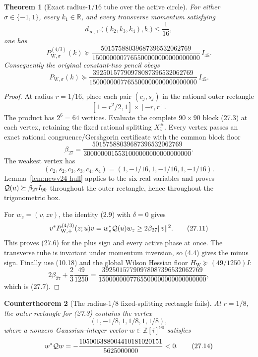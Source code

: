 \documentclass[11pt,oneside]{article}
\newtheorem{theorem}{Theorem}[section]
\newtheorem{countertheorem}[theorem]{Countertheorem}
\theoremstyle{definition}
\theoremstyle{remark}
\begin{document}
\begin{theorem}[Exact radius-\(1/16\) tube over the active circle]
\label{thm:newv27-circle-tube}
For either \(\sigma\in\{-1,1\}\), every \(k_1\in\mathbb R\), and
every transverse momentum satisfying
\[
 d_{\infty,\mathbb T^3}
 \bigl((k_2,k_3,k_4),b_\circ\bigr)\le\frac1{16},         \tag{27.5}
\]
one has
\[
 P_{\mathrm W,\sigma}^{(4/3)}(k)\succeq
 \frac{50157588039687396532062769}
 {1500000007765500000000000000000}\,I_{45}.             \tag{27.6}
\]
Consequently the original constant-two pencil obeys
\[
 P_{\mathrm W,\sigma}(k)\succeq
 \frac{39250157790978087396532062769}
 {1500000007765500000000000000000}\,I_{45}.             \tag{27.7}
\]
\end{theorem}

\begin{proof}
At radius \(r=1/16\), place each pair \((c_j,s_j)\) in the rational
outer rectangle
\[
 [1-r^2/2,1]\times[-r,r].                               \tag{27.8}
\]
The product has \(2^6=64\) vertices.  Evaluate the complete
\(90\times90\) block (27.3) at each vertex, retaining the fixed
rational splitting \(X_\circ^\#\).  Every vertex passes an exact
rational congruence/Gershgorin certificate with the common block
floor
\[
 \beta_{27}=
 \frac{50157588039687396532062769}
 {3000000015531000000000000000000}.                     \tag{27.9}
\]
The weakest vertex has
\[
 (c_2,s_2,c_3,s_3,c_4,s_4)
 =(1,-1/16,1,-1/16,1,-1/16).                           \tag{27.10}
\]
Lemma~\ref{lem:newv24-hull} applies to the six real variables and
proves \({\cal Q}(u)\succeq\beta_{27}I_{90}\) throughout the outer
rectangle, hence throughout the trigonometric box.

For \(w_z=(v,zv)\), the identity (2.9) with \(\delta=0\) gives
\[
 v^*P_{\mathrm W,+}^{(4/3)}(z;u)v
 =w_z^*{\cal Q}(u)w_z
 \ge2\beta_{27}\|v\|^2.                                 \tag{27.11}
\]
This proves (27.6) for the plus sign and every active phase at once.
The transverse tube is invariant under momentum inversion, so (4.4)
gives the minus sign.  Finally use (10.18) and the global Wilson
Hessian floor \(H_{\mathrm W}\succeq(49/1250)I\):
\[
 2\beta_{27}+\frac23\frac{49}{1250}
 =
 \frac{39250157790978087396532062769}
 {1500000007765500000000000000000},                     \tag{27.12}
\]
which is (27.7).
\end{proof}

\begin{countertheorem}[The radius-\(1/8\) fixed-splitting rectangle fails]
\label{ctr:newv27-eighth-relaxation}
At \(r=1/8\), the outer rectangle for (27.3) contains the vertex
\[
 (1,-1/8,1,1/8,1,1/8),                                 \tag{27.13}
\]
where a nonzero Gaussian-integer vector \(w\in\mathbb Z[i]^{90}\)
satisfies
\[
 w^*{\cal Q}w
 =-\frac{105006388004410181020151}{5625000000}<0.       \tag{27.14}
\]
\end{countertheorem}
\end{document}
